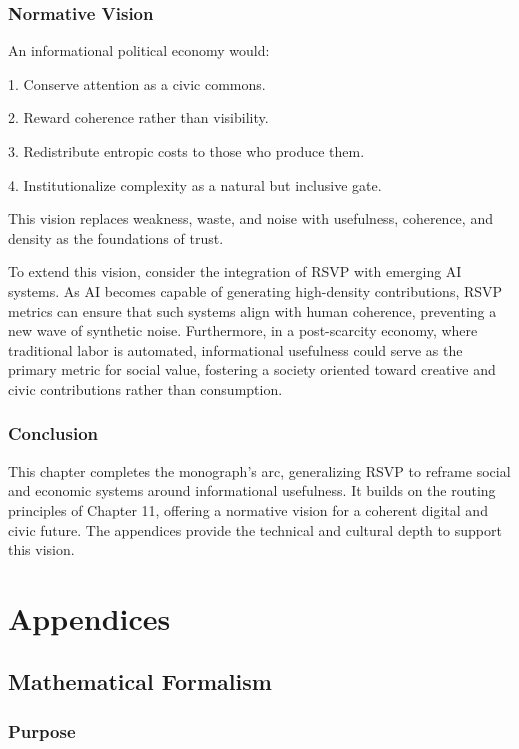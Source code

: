 \documentclass{book}
\begin{document}
\section{Normative Vision}

An informational political economy would:

1. Conserve attention as a civic commons.

2. Reward coherence rather than visibility.

3. Redistribute entropic costs to those who produce them.

4. Institutionalize complexity as a natural but inclusive gate.

This vision replaces weakness, waste, and noise with usefulness, coherence, and density as the foundations of trust.

To extend this vision, consider the integration of RSVP with emerging AI systems. As AI becomes capable of generating high-density contributions, RSVP metrics can ensure that such systems align with human coherence, preventing a new wave of synthetic noise. Furthermore, in a post-scarcity economy, where traditional labor is automated, informational usefulness could serve as the primary metric for social value, fostering a society oriented toward creative and civic contributions rather than consumption.

\section{Conclusion}

This chapter completes the monograph’s arc, generalizing RSVP to reframe social and economic systems around informational usefulness. It builds on the routing principles of Chapter 11, offering a normative vision for a coherent digital and civic future. The appendices provide the technical and cultural depth to support this vision.

\part{Appendices}

\appendix
\chapter{Mathematical Formalism}

\section{Purpose}
\end{document}
